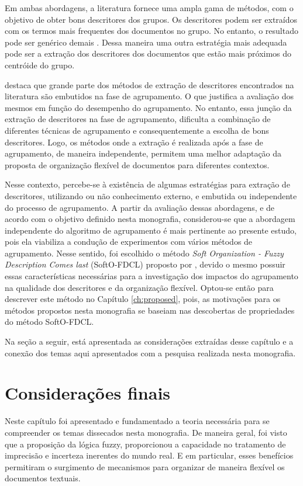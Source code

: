 Em ambas abordagens, a literatura fornece uma ampla gama de métodos, com o objetivo de obter bons
descritores dos grupos. Os descritores podem ser extraídos com os termos mais frequentes dos
documentos no grupo. No entanto, o resultado pode ser genérico demais \cite{Pucktada2006}. Dessa
maneira uma outra estratégia mais adequada pode ser a extração dos descritores dos documentos que
estão mais próximos do centróide do grupo.

 destaca que grande parte dos métodos de extração de descritores
encontrados na literatura são embutidos na fase de agrupamento. O que justifica a avaliação dos
mesmos em função do desempenho do agrupamento. No entanto, essa junção da extração de descritores na
fase de agrupamento, dificulta a combinação de diferentes técnicas de agrupamento e consequentemente
a escolha de bons descritores. Logo, os métodos onde a extração é realizada após a fase de
agrupamento, de maneira independente, permitem uma melhor adaptação da proposta de organização
flexível de documentos para diferentes contextos. 

Nesse contexto, percebe-se à existência de algumas estratégias para extração de descritores,
utilizando ou não conhecimento externo, e embutida ou independente do processo de agrupamento. A
partir da avaliação dessas abordagens, e de acordo com o objetivo definido nesta monografia,
considerou-se que a abordagem independente do algoritmo de agrupamento é mais pertinente ao presente
estudo, pois ela viabiliza a condução de experimentos com vários métodos de agrupamento. Nesse
sentido, foi escolhido o método {\it Soft Organization - Fuzzy Description Comes last\/}
(SoftO-FDCL) proposto por , devido o mesmo possuir essas características
necessárias para a investigação dos impactos do agrupamento na qualidade dos descritores e da
organização flexível. Optou-se então para descrever este método no Capítulo \ref{ch:proposed}, pois,
as motivações para os métodos propostos nesta monografia se baseiam nas descobertas de propriedades
do método SoftO-FDCL.

Na seção a seguir, está apresentada as considerações extraídas desse capítulo e a conexão dos temas
aqui apresentados com a pesquisa realizada nesta monografia.

\section{Considerações finais}

Neste capítulo foi apresentado e fundamentado a teoria necessária para se compreender os temas
dissecados nesta monografia. De maneira geral, foi visto que a proposição da lógica fuzzy,
proporcionou a capacidade no tratamento de imprecisão e incerteza inerentes do mundo real. E em
particular, esses benefícios permitiram o surgimento de mecanismos para organizar de maneira
flexível os documentos textuais. 

